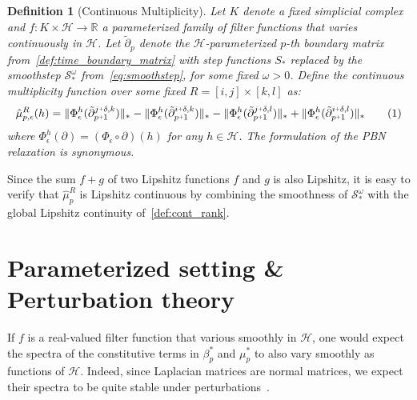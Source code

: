 \documentclass[10pt]{article}
\numberwithin{equation}{section}
\newcommand{\+}{%
	\raisebox{0.18ex}{\scaleobj{0.55}{+}}
}
\newtheorem{definition}{Definition}
\newtheorem{corollary}{Corollary}
\theoremstyle{definition}
\newcommand\numberthis{\addtocounter{equation}{1}\tag{\theequation}}
\begin{document}
\begin{definition}[Continuous Multiplicity]
Let $K$ denote a fixed simplicial complex and $f: K \times \mathcal{H} \to \mathbb{R}$ a parameterized family of filter functions that varies continuously in $\mathcal{H}$. Let $\tilde{\partial}_p$ denote the $\mathcal{H}$-parameterized $p$-th boundary matrix from~\ref{def:time_boundary_matrix} with step functions $S_\ast$ replaced by the smoothstep $\mathcal{S}_\ast^\omega$ from~\eqref{eq:smoothstep}, for some fixed $\omega > 0$. Define the \emph{continuous multiplicity function} over some fixed $R = [i,j] \times [k,l]$ as:
	\begin{equation}\label{eq:mu_cont}
	\hat{\mu}_{p,\epsilon}^R(h) = 
		 \lVert \Phi_\epsilon^h(\tilde{\partial}_{p\+1}^{j \+ \delta, k}) \rVert_\ast - 
		 \lVert \Phi_\epsilon^h(\tilde{\partial}_{p\+1}^{i \+ \delta, k}) \rVert_\ast -  
		 \lVert \Phi_\epsilon^h(\tilde{\partial}_{p\+1}^{j \+ \delta, l}) \rVert_\ast + 
		 \lVert \Phi_\epsilon^h(\tilde{\partial}_{p\+1}^{i \+ \delta, l}) \rVert_\ast \numberthis
\end{equation}
where $\Phi_\epsilon^h(\partial) = (\Phi_\epsilon \circ \partial)(h)$ for any $h \in \mathcal{H}$. The formulation of the PBN relaxation is synonymous.
\end{definition}
\noindent Since the sum $f + g$ of two Lipshitz functions $f$ and $g$ is also Lipshitz, it is easy to verify that $\hat{\mu}_p^R$ is Lipshitz continuous by combining the smoothness of $\mathcal{S}_\ast^\omega$ with the global Lipshitz continuity of~\eqref{def:cont_rank}. 





\section{Parameterized setting \& Perturbation theory}
If $f$ is a real-valued filter function that various smoothly in $\mathcal{H}$, one would expect the spectra of the constitutive terms in $\beta_p^\ast$ and $\mu_p^\ast$ to also vary smoothly as functions of $\mathcal{H}$.
Indeed, since Laplacian matrices are normal matrices, we expect their spectra to be quite stable under perturbations~\cite{}. 
\end{document}
